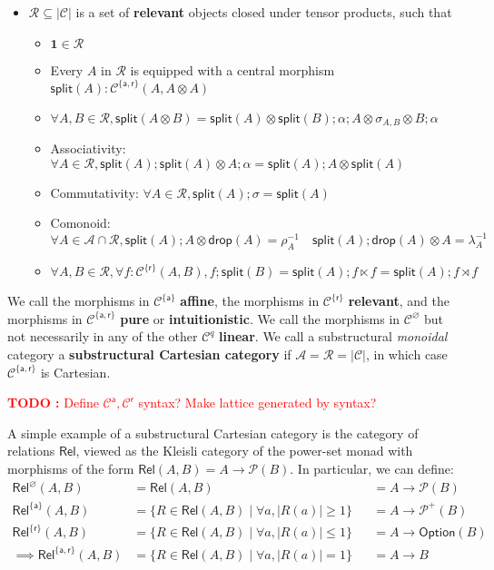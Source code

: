 \documentclass[acmsmall,screen,review]{acmart}
\newcounter{todos}
\newcommand{\TODO}[1]{{
  \stepcounter{todos}
  \begin{center}\large{\textcolor{red}{\textbf{TODO \arabic{todos}:} #1}}\end{center}
}}
\newcommand{\mc}[1]{\ensuremath{\mathcal{#1}}}
\newcommand{\mb}[1]{\ensuremath{\mathbf{#1}}}
\newcommand{\ms}[1]{\ensuremath{\mathsf{#1}}}
\begin{document}
\begin{definition}
\begin{itemize}
\begin{itemize}
    \end{itemize}
    \item \(\mc{R} \subseteq |\mc{C}|\) is a set of \textbf{relevant} objects closed under tensor products, such that
    \begin{itemize}
      \item \(\mb{1} \in \mc{R}\)
      \item Every \(A\) in \(\mc{R}\) is equipped with a central morphism \(\ms{split}(A): \mc{C}^{\{\ms{a}, \ms{r}\}}(A, A \otimes A)\)
      \item \(\forall A, B \in \mc{R}, \ms{split}(A \otimes B) = \ms{split}(A) \otimes \ms{split}(B);\alpha;A \otimes \sigma_{A, B} \otimes B;\alpha\)
      \item Associativity: \(\forall A \in \mc{R}, \ms{split}(A);\ms{split}(A) \otimes A;\alpha = \ms{split}(A);A \otimes \ms{split}(A)\)
      \item Commutativity: \(\forall A \in \mc{R}, \ms{split}(A);\sigma = \ms{split}(A)\)
      \item Comonoid: \(\forall A \in \mc{A} \cap \mc{R}, \ms{split}(A);A \otimes \ms{drop}(A) = \rho_A^{-1} \quad \ms{split}(A);\ms{drop}(A) \otimes A = \lambda_A^{-1}\)
      \item \(\forall A, B \in \mc{R}, \forall f: \mc{C}^{\{\ms{r}\}}(A, B), f;\ms{split}(B) = \ms{split}(A);f \ltimes f = \ms{split}(A);f\rtimes f\)
    \end{itemize}
  \end{itemize}
  We call the morphisms in \(\mc{C}^{\{\ms{a}\}}\) \textbf{affine}, the morphisms in \(\mc{C}^{\{\ms{r}\}}\) \textbf{relevant}, and the morphisms in \(\mc{C}^{\{\ms{a}, \ms{r}\}}\) \textbf{pure} or \textbf{intuitionistic}. We call the morphisms in \(\mc{C}^\varnothing\) but not necessarily in any of the other \(\mc{C}^q\) \textbf{linear}. We call a substructural \textit{monoidal} category a \textbf{substructural Cartesian category} if \(\mc{A} = \mc{R} = |\mc{C}|\), in which case \(\mc{C}^{\{\ms{a}, \ms{r}\}}\) is Cartesian.
\end{definition}
\TODO{Define \(\mc{C}^{\ms{a}}, \mc{C}^{\ms{r}}\) syntax? Make lattice generated by syntax?}
A simple example of a substructural Cartesian category is the category of relations \(\ms{Rel}\), viewed as the Kleisli category of the power-set monad with morphisms of the form \(\ms{Rel}(A, B) = A \to \mc{P}(B)\). In particular, we can define:
\begin{equation}
  \begin{aligned}
    \ms{Rel}^\varnothing(A, B) 
    &= \ms{Rel}(A, B) 
    &&= A \to \mc{P}(B) \\
    \ms{Rel}^{\{\ms{a}\}}(A, B) 
    &= \{R \in \ms{Rel}(A, B) \mid \forall a, |R(a)| \geq 1\} 
    &&= A \to \mc{P}^+(B) \\
    \ms{Rel}^{\{\ms{r}\}}(A, B) 
    &= \{R \in \ms{Rel}(A, B) \mid \forall a, |R(a)| \leq 1\} 
    &&= A \to \ms{Option}(B) \\
    \implies \ms{Rel}^{\{\ms{a}, \ms{r}\}}(A, B) 
    &= \{R \in \ms{Rel}(A, B) \mid \forall a, |R(a)| = 1\} 
    &&= A \to B
  \end{aligned}
\end{equation}
\end{document}
